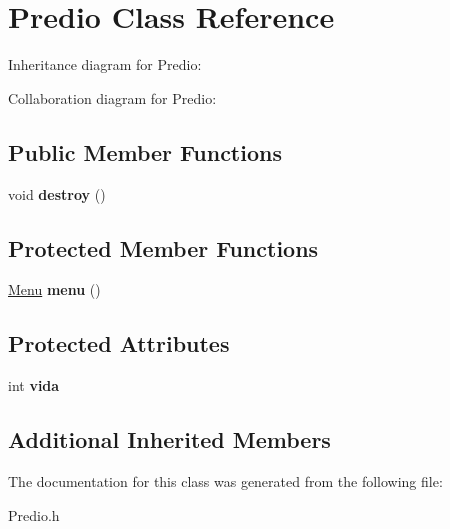 \hypertarget{classPredio}{}\section{Predio Class Reference}
\label{classPredio}


Inheritance diagram for Predio\+:


Collaboration diagram for Predio\+:
\subsection*{Public Member Functions}
\begin{DoxyCompactItemize}
\item 
void {\bfseries destroy} ()\hypertarget{classPredio_aef23b892d39d15b9aab03d77628cffa0}{}\label{classPredio_aef23b892d39d15b9aab03d77628cffa0}

\end{DoxyCompactItemize}
\subsection*{Protected Member Functions}
\begin{DoxyCompactItemize}
\item 
\hyperlink{classMenu}{Menu} {\bfseries menu} ()\hypertarget{classPredio_a6fc09c1519288eba8bbda8dea346f994}{}\label{classPredio_a6fc09c1519288eba8bbda8dea346f994}

\end{DoxyCompactItemize}
\subsection*{Protected Attributes}
\begin{DoxyCompactItemize}
\item 
int {\bfseries vida}\hypertarget{classPredio_a6d3adf25183062c54ea41c5b3c976e1f}{}\label{classPredio_a6d3adf25183062c54ea41c5b3c976e1f}

\end{DoxyCompactItemize}
\subsection*{Additional Inherited Members}


The documentation for this class was generated from the following file\+:\begin{DoxyCompactItemize}
\item 
Predio.\+h\end{DoxyCompactItemize}
